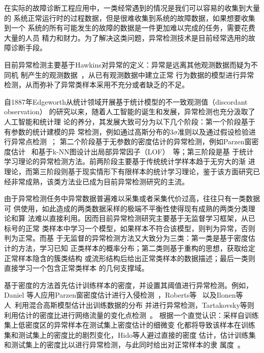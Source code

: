 在实际的故障诊断工程应用中，一类经常遇到的情况是我们可以容易的收集到大量的
系统正常运行时的过程数据，但是很难收集到系统的故障数据，如果想要收集到一个
系统的所有可能发生的故障的数据是一件更加难以完成的任务，需要花费大量的人员
精力和财力。为了解决这类问题，异常检测技术是目前经常选用的故障诊断手段。

目前异常检测主要基于Hawkins对异常的定义：异常是远离其他观测数据而疑为不同机
制产生的观测数据~\cite{hawkins1980identification}，从已有观测数据中建立正常
行为数据的模型进行异常检测，从而弥补了异常类样本采用不充分或者缺乏的不足。

自1887年Edgeworth从统计领域开展基于统计模型的不一致观测值（discordant observation）
的研究以来，随着人工智能的诞生和发展，异常检测也充分汲取了人工智能和统计理
论的养分，其发展大致可分为以下几个阶段：第一个阶段基于有参数的统计建模的异
常检测，例如通过高斯分布的$3\sigma$准则以及通过假设检验进行异常点检测~\cite{edgeworth1887xli, viljoen2002identifying}；
第二个阶段基于无参数的密度估计的异常检测，例如Parzen窗密度估计~\cite{yeung2002parzen, duda2012pattern}
和基于k-NN图设计出局部异常因子（LOF）~\cite{breunig2000lof}等；第三阶段是基
于统计学习理论的异常检测方法。前两阶段主要基于传统统计学样本趋于无穷大的渐
进理论，而第三阶段则基于现实情形下有限样本的统计学习理论，鉴于该方面研究已
经非常成熟，该类方法业已成为目前异常检测研究的主流。

由于异常检测任务中异常数据普遍难以采集或者采集代价过高，往往只有一类数据可
供使用，如此造成的两类数据采样的极端不平衡性使得现有成熟的两类分类理论和算
法难以直接利用。因而目前异常检测研究主要基于无监督学习框架，从已标号的正常
类样本中学习一个模型，如果样本不符合该模型，则判为异常，否则判为正常。而基
于无监督的异常检测方法又大致分为三类：第一类是基于密度估计的方法，学习已知
正类样本的概率分布；第二类则基于重构的思想，获取给定正常样本隐含的簇类结构
或流形结构后给出正常类样本的数据描述；最后一类则直接学习一个包含正常类样本
的几何支撑域。 

基于密度的方法首先估计训练样本的密度，并设置其阈值进行异常检测。例如，Daniel
等人应用Parzen窗密度估计进行入侵检测~\cite{duda2012pattern}，Roberts等~\cite{roberts1994probabilistic}
以及Ilonen等人~\cite{ilonen2006gaussian}利用混合高斯模型估计出训练数据的分布
并进行异常检测，Tartakovsky等则利用估计的密度比进行网络流量的变化点检测~\cite{tartakovsky2013efficient}。
根据一个直觉认识：采样自训练集上低密度区的异常样本在测试集上密度估计的细微变
化都将导致该样本在训练集和测试集上的密度比的剧烈变化，Hido等人避过直接的密度
估计，估计训练集和测试集上的密度比以进行异常检测，与此同时给出对正常样本的隶
属度~\cite{hido2011statistical}。

